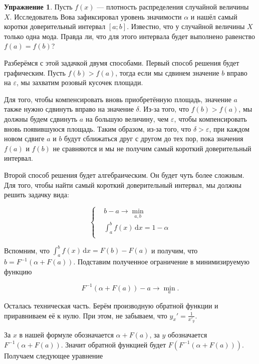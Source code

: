 \documentclass[12pt, a4paper, oneside]{extreport}
\newcommand{\dx}[1]{\,\mathrm{d}#1} %
\theoremstyle{plain}              %
\theoremstyle{definition}         %
\newtheorem{problem}{\color{myblue} Упражнение}
\begin{document}
\begin{problem}\label{upr_conf}
Пусть $f(x)$ --- плотность распределения случайной величины $X$. Исследователь Вова зафиксировал уровень значимости $\alpha$ и нашёл самый коротки доверительный интервал $[a;b]$. Известно, что у случайной величины $X$ только одна мода. Правда ли, что для этого интервала будет выполнено равенство $f(a) = f(b)$? 
\begin{sol}
Разберёмся с этой задачкой двумя способами. Первый способ решения будет графическим. Пусть $f(b) > f(a)$, тогда если мы сдвинем значение $b$ вправо на $\varepsilon$, мы захватим розовый кусочек площади. 


Для того, чтобы компенсировать вновь приобретённую площадь, значение $a$ также нужно сдвинуть вправо на значение $\delta$. Из-за того, что $f(b) > f(a)$, мы должны будем сдвинуть $a$ на большую величину, чем $\varepsilon$, чтобы компенсировать вновь появившуюся площадь. Таким образом, из-за того, что $\delta > \varepsilon$, при каждом новом сдвиге $a$ и $b$ будут сближаться друг с другом до тех пор, пока значения $f(a)$ и $f(b)$ не сравняются и мы не получим самый короткий доверительный интервал. 


Второй способ решения будет алгебраическим. Он будет чуть более сложным. Для того, чтобы найти самый короткий доверительный интервал, мы должны решить задачку вида: 

\begin{equation*}
\left \{
\begin{aligned}
&b - a \longrightarrow \min_{a,b}  \\
&\int_a^b f(x) \dx{x} = 1 - \alpha \\
\end{aligned}
\right.
\end{equation*}

Вспомним, что $\int_a^b f(x) \dx{x} = F(b) - F(a)$ и получим, что $b = F^{-1}(\alpha + F(a))$. Подставим полученное ограничение в минимизируемую функцию

\[ F^{-1}(\alpha + F(a)) - a \to \min_a.\]

Осталась техническая часть. Берём производную обратной функции и приравниваем её к нулю. При этом, не забываем, что $y_x' = \frac{1}{x'_y}$.

За $x$ в нашей формуле обозначается $\alpha + F(a)$, за $y$ обозначается $F^{-1}(\alpha + F(a))$. Значит обратной функцией будет $F(F^{-1}(\alpha + F(a)))$. Получаем следующее уравнение


\end{sol}
\end{problem}
\end{document}
